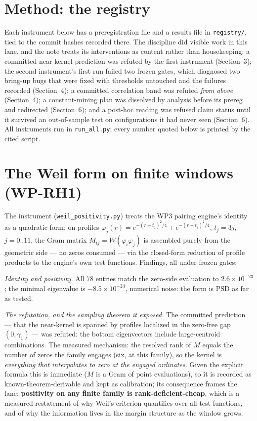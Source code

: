 \documentclass[11pt]{article}
\theoremstyle{remark}
\begin{document}
\section{Method: the registry}

Each instrument below has a preregistration file and a results file in \texttt{registry/}, tied to
the commit hashes recorded there. The discipline did visible work in this lane, and the note treats
its interventions as content rather than housekeeping:
a committed near-kernel prediction was refuted by the first instrument (Section~3); the second
instrument's first run failed two frozen gates, which diagnosed two bring-up bugs that were fixed
with thresholds untouched and the failures recorded (Section~4); a committed correlation band was
refuted \emph{from above} (Section~4); a constant-mining plan was dissolved by analysis before its
prereg and redirected (Section~6); and a post-hoc reading was refused claim status until it survived
an out-of-sample test on configurations it had never seen (Section~6). All instruments run in
\texttt{run\_all.py}; every number quoted below is printed by the cited script.

\section{The Weil form on finite windows (WP-RH1)}

The instrument (\texttt{weil\_positivity.py}) treats the WP3 pairing engine's identity
\cite{Essay} as a quadratic form: on profiles $\varphi_j(r) = e^{-(r-t_j)^2/4} + e^{-(r+t_j)^2/4}$,
$t_j = 3j$, $j = 0..11$, the Gram matrix $M_{ij} = W(\varphi_i\varphi_j)$ is assembled purely from
the geometric side --- no zeros consumed --- via the closed-form reduction of profile products to the
engine's own test functions. Findings, all under frozen gates:

\emph{Identity and positivity.} All 78 entries match the zero-side evaluation to
$2.6\times10^{-23}$; the minimal eigenvalue is $-8.5\times10^{-24}$, numerical noise: the form is
PSD as far as tested.

\emph{The refutation, and the sampling theorem it exposed.} The committed prediction --- that the
near-kernel is spanned by profiles localized in the zero-free gap $(0, \gamma_1)$ --- was refuted:
the bottom eigenvectors include large-centroid combinations. The measured mechanism: the resolved
rank of $M$ equals the number of zeros the family engages (six, at this family), so the kernel is
\emph{everything that interpolates to zero at the engaged ordinates}. Given the explicit formula
this is immediate ($M$ is a Gram of point evaluations), so it is recorded as known-theorem-derivable
and kept as calibration; its consequence frames the lane: \textbf{positivity on any finite family is
rank-deficient-cheap}, which is a measured restatement of why Weil's criterion quantifies over all
test functions, and of why the information lives in the margin structure as the window grows.
\end{document}
